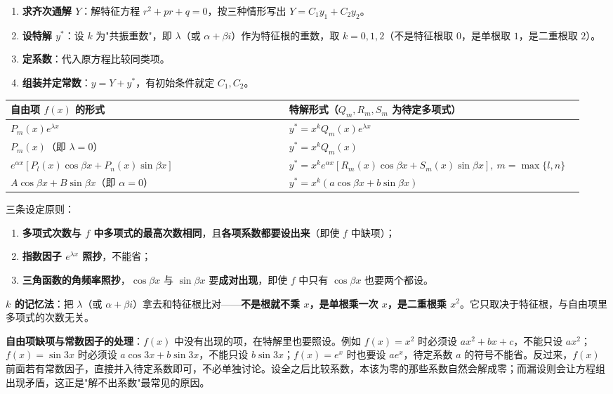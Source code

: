 \documentclass[11pt,openany,UTF8]{ctexbook}
\begin{document}
\begin{enumerate}
\item \textbf{求齐次通解 $Y$}：解特征方程 $r^{2}+pr+q=0$，按三种情形写出 $Y=C_1y_1+C_2y_2$。
\item \textbf{设特解 $y^{*}$}：设 $k$ 为"共振重数"，即 $\lambda$（或 $\alpha+\beta i$）作为特征根的重数，取 $k=0,1,2$（不是特征根取 $0$，是单根取 $1$，是二重根取 $2$）。
\item \textbf{定系数}：代入原方程比较同类项。
\item \textbf{组装并定常数}：$y=Y+y^{*}$，有初始条件就定 $C_1,C_2$。
\end{enumerate}
\begingroup\small\setlength{\tabcolsep}{4.0pt}
\begin{longtable}{@{}L{0.4728\linewidth}L{0.4728\linewidth}@{}}
\toprule
\textbf{自由项 $f(x)$ 的形式} & \textbf{特解形式（$Q_m,R_m,S_m$ 为待定多项式）} \\
\midrule
\endhead
$P_m(x)e^{\lambda x}$ & $y^{*}=x^{k}Q_m(x)e^{\lambda x}$ \\
$P_m(x)$（即 $\lambda=0$） & $y^{*}=x^{k}Q_m(x)$ \\
$e^{\alpha x}\left[P_l(x)\cos\beta x+P_n(x)\sin\beta x\right]$ & $y^{*}=x^{k}e^{\alpha x}\left[R_m(x)\cos\beta x+S_m(x)\sin\beta x\right],\allowbreak\ m=\max\{l,n\}$ \\
$A\cos\beta x+B\sin\beta x$（即 $\alpha=0$） & $y^{*}=x^{k}\left(a\cos\beta x+b\sin\beta x\right)$ \\
\bottomrule
\end{longtable}
\endgroup

三条设定原则：

\begin{enumerate}
\item \textbf{多项式次数与 $f$ 中多项式的最高次数相同}，且\textbf{各项系数都要设出来}（即使 $f$ 中缺项）；
\item \textbf{指数因子 $e^{\lambda x}$ 照抄}，不能省；
\item \textbf{三角函数的角频率照抄}，$\cos\beta x$ 与 $\sin\beta x$ 要\textbf{成对出现}，即使 $f$ 中只有 $\cos\beta x$ 也要两个都设。
\end{enumerate}
\textbf{$k$ 的记忆法}：把 $\lambda$（或 $\alpha+\beta i$）拿去和特征根比对——\textbf{不是根就不乘 $x$，是单根乘一次 $x$，是二重根乘 $x^{2}$}。它只取决于特征根，与自由项里多项式的次数无关。

\textbf{自由项缺项与常数因子的处理}：$f(x)$ 中没有出现的项，在特解里也要照设。例如 $f(x)=x^{2}$ 时必须设 $ax^{2}+bx+c$，不能只设 $ax^{2}$；$f(x)=\sin 3x$ 时必须设 $a\cos 3x+b\sin 3x$，不能只设 $b\sin 3x$；$f(x)=e^{x}$ 时也要设 $ae^{x}$，待定系数 $a$ 的符号不能省。反过来，$f(x)$ 前面若有常数因子，直接并入待定系数即可，不必单独讨论。设全之后比较系数，本该为零的那些系数自然会解成零；而漏设则会让方程组出现矛盾，这正是"解不出系数"最常见的原因。
\end{document}
